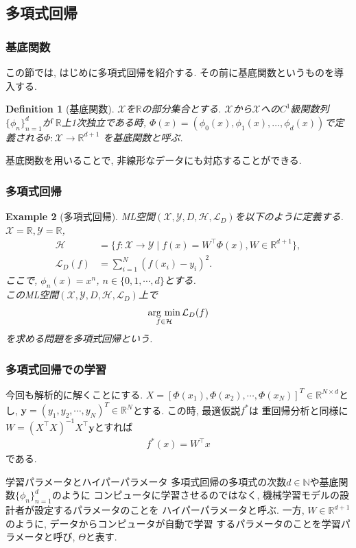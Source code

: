 \documentclass[dvipdfmx,11pt]{beamer}		%
\newtheorem{defi}{Definition}
\newtheorem{exam}[defi]{Example}
\newcommand{\N}{\mathbb{N}}
\newcommand{\R}{\mathbb{R}}
\newcommand{\X}{\mathcal{X}}
\newcommand{\Y}{\mathcal{Y}}
\newcommand{\Hil}{\mathcal{H}}
\newcommand{\Loss}{\mathcal{L}_{D}}
\newcommand{\MLsp}{(\X, \Y, D, \Hil, \Loss)}
\newcommand{\argmin}{\mathop{\rm arg~min}\limits}
\begin{document}
    \subsection{多項式回帰}
    \begin{frame}
        \frametitle{基底関数}
        この節では, はじめに多項式回帰を紹介する. 
        その前に基底関数というものを導入する. 
        \begin{defi}[基底関数]
            $\X$を$\R$の部分集合とする. $\X$から$\X$への$C^1$級関数列$\{\phi_{n}\}_{n = 1}^{d}$が
            $\R$上1次独立である時, $\Phi(x) = (\phi_{0}(x), \phi_{1}(x), \ldots, \phi_{d}(x))$で定義される$\Phi:\X\to\R^{d + 1}$
            を基底関数と呼ぶ. 
        \end{defi}
        基底関数を用いることで, 非線形なデータにも対応することができる. 
    \end{frame}
    \begin{frame}\frametitle{多項式回帰}
        \begin{exam}[多項式回帰]
            ML空間$\MLsp$を以下のように定義する.\\
            $\X = \R, \Y = \R$, 
            \footnotesize
            \begin{align*}
                \Hil &= \{f:\X\to\Y\mid f(x) = W^{\top}\Phi(x), W\in\R^{d + 1}\},\\
                \Loss(f) &= \sum_{i = 1}^{N}(f(x_i) - y_i)^2.
            \end{align*}
            \normalsize
            ここで, $\phi_{n}(x) = x^{n}$, $n\in\{0, 1, \cdots, d\}$とする.\\
            このML空間$\MLsp$上で
            \begin{align*}
                \argmin_{f\in\Hil}\Loss(f)
            \end{align*}
            を求める問題を多項式回帰という. 
        \end{exam}
    \end{frame}
    \begin{frame}
        \frametitle{多項式回帰での学習}
            今回も解析的に解くことにする. $X = [\Phi(x_1), \Phi(x_{2}), \cdots, \Phi(x_N)]^{T}\in\R^{N\times d}$とし, 
            $\mathbf{y} = (y_{1}, y_{2}, \cdots, y_{N})^{T}\in\R^{N}$とする. この時, 最適仮説$f^{*}$は
            重回帰分析と同様に$W = (X^\top X)^{-1}X^\top\mathbf{y}$とすれば
            \begin{align*}
                f^{*}(x) = W^{\top}x
            \end{align*}
            である. 
            \begin{block}{学習パラメータとハイパーパラメータ}
                多項式回帰の多項式の次数$d\in\N$や基底関数$\{\phi_{n}\}_{n = 1}^{d}$のように
                コンピュータに学習させるのではなく, 機械学習モデルの設計者が設定するパラメータのことを
                ハイパーパラメータと呼ぶ. 一方, $W\in\R^{d + 1}$のように, データからコンピュータが自動で学習
                するパラメータのことを学習パラメータと呼び, $\Theta$と表す.
            \end{block}
    \end{frame}
\end{document}
